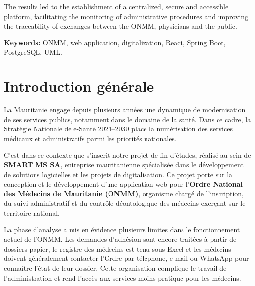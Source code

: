 ﻿\documentclass[12pt,a4paper]{report}
\begin{document}
The results led to the establishment of a centralized, secure and accessible
platform, facilitating the monitoring of administrative procedures and improving
the traceability of exchanges between the ONMM, physicians and the public.

\textbf{Keywords:}
ONMM, web application, digitalization,
React, Spring Boot, PostgreSQL, UML.



\cleardoublepage
{}

\chapter*{Introduction générale}

La Mauritanie engage depuis plusieurs années une dynamique de modernisation
de ses services publics, notamment dans le domaine de la santé. Dans ce cadre,
la Stratégie Nationale de e-Santé 2024--2030 place la numérisation des services
médicaux et administratifs parmi les priorités nationales.

C'est dans ce contexte que s'inscrit notre projet de fin d'études, réalisé au
sein de \textbf{SMART MS SA}, entreprise mauritanienne spécialisée dans le
développement de solutions logicielles et les projets de digitalisation. Ce
projet porte sur la conception et le développement d'une application web pour
l'\textbf{Ordre National des Médecins de Mauritanie (ONMM)}, organisme chargé
de l'inscription, du suivi administratif et du contrôle déontologique des
médecins exerçant sur le territoire national.

La phase d'analyse a mis en évidence plusieurs limites dans le fonctionnement actuel de l'ONMM. Les demandes d'adhésion sont encore traitées à partir de dossiers papier, le registre des médecins est tenu sous Excel et les médecins doivent généralement contacter l'Ordre par téléphone, e-mail ou WhatsApp pour connaître l'état de leur dossier. Cette organisation complique le travail de l'administration et rend l'accès aux services moins pratique pour les médecins.
\end{document}
